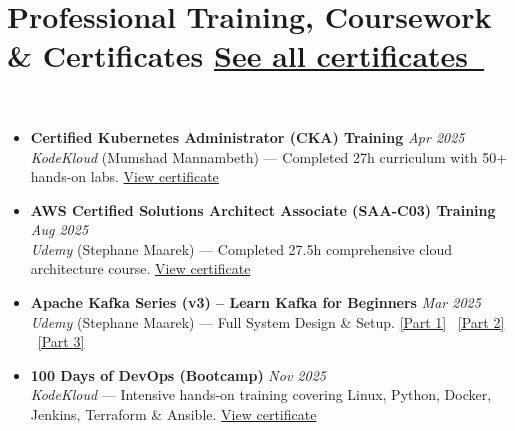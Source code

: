\section*{Professional Training, Coursework \& Certificates \hfill
\href{https://harshanalf.netlify.app/certificates}{See all certificates~}}


\BigDivider\\
\begin{itemize}[leftmargin=*, itemsep=0.35em]

\item
    \noindent\textbf{Certified Kubernetes Administrator (CKA) Training} \hfill \textit{Apr 2025} \\[-0.1em]
    {\footnotesize \emph{KodeKloud} (Mumshad Mannambeth) --- Completed 27h curriculum with 50+ hands-on labs.}%
    \hfill\href{https://www.udemy.com/certificate/UC-246987b5-df13-4f9b-a53f-d74d9de0d221/}{View certificate}

    \item
    \noindent\textbf{AWS Certified Solutions Architect Associate (SAA-C03) Training} \hfill \textit{Aug 2025} \\[-0.1em]
    {\footnotesize \emph{Udemy} (Stephane Maarek) --- Completed 27.5h comprehensive cloud architecture course.}%
    \hfill\href{https://www.udemy.com/certificate/UC-b1ef5d20-5c70-472f-a936-96567f299af7/}{View certificate}

\item
    \noindent\textbf{Apache Kafka Series (v3) -- Learn Kafka for Beginners} \hfill \textit{Mar 2025} \\[-0.1em]
    {\footnotesize \emph{Udemy} (Stephane Maarek) --- Full System Design \& Setup.}%
    \hfill
    {\scriptsize
        \href{https://www.udemy.com/certificate/UC-ec3b908f-9983-4510-bdb1-bc1fb5567a2d/}{[Part 1]} \textbar\ 
        \href{https://www.udemy.com/certificate/UC-6c2275bc-4236-441a-9cb6-de7ada31a3c8/}{[Part 2]} \textbar\ 
        \href{https://www.udemy.com/certificate/UC-1e1e34e9-0ba4-4c9d-bf10-3b5b16ee6f10/}{[Part 3]}
    }

\item
\noindent\textbf{100 Days of DevOps (Bootcamp)} \hfill \textit{Nov 2025} \\[-0.1em]
{\footnotesize \emph{KodeKloud} --- Intensive hands-on training covering Linux, Python, Docker, Jenkins, Terraform \& Ansible.}%
\hfill\href{https://engineer.kodekloud.com/certificate-verification/8a2e35fb-02fd-4082-aff3-d1fbc291f0d1}{View certificate}


\end{itemize}
